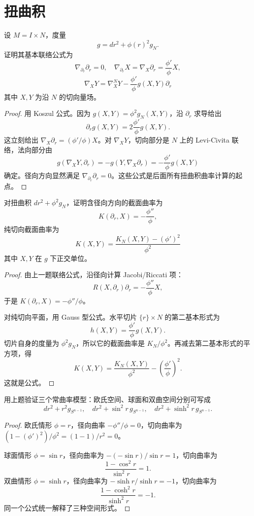 \documentclass[11pt,a4paper,openany]{ctexbook}
\numberwithin{equation}{chapter}
\begin{document}
\section{扭曲积}

\begin{problem}
设 \(M=I\times N\)，度量
\[
g=dr^2+\phi(r)^2g_N.
\]
证明其基本联络公式为
\[
\nabla_{\partial_r}\partial_r=0,\quad
\nabla_{\partial_r}X=\nabla_X\partial_r=\frac{\phi'}{\phi}X,
\]
\[
\nabla_XY=\nabla^N_XY-\frac{\phi'}{\phi}g(X,Y)\partial_r
\]
其中 \(X,Y\) 为沿 \(N\) 的切向量场。
\end{problem}
\begin{proof}
用 Koszul 公式。因为 \(g(X,Y)=\phi^2g_N(X,Y)\)，沿 \(\partial_r\) 求导给出
\[
\partial_r g(X,Y)=2\frac{\phi'}{\phi}g(X,Y).
\]
这立刻给出 \(\nabla_X\partial_r=(\phi'/\phi)X\)。对 \(\nabla_XY\)，切向部分是 \(N\) 上的 Levi-Civita 联络，法向部分由
\[
g(\nabla_XY,\partial_r)=-g(Y,\nabla_X\partial_r)=-\frac{\phi'}{\phi}g(X,Y)
\]
确定。径向方向显然满足 \(\nabla_{\partial_r}\partial_r=0\)。这些公式是后面所有扭曲积曲率计算的起点。
\end{proof}

\begin{problem}
对扭曲积 \(dr^2+\phi^2g_N\)，证明含径向方向的截面曲率为
\[
K(\partial_r,X)=-\frac{\phi''}{\phi},
\]
纯切向截面曲率为
\[
K(X,Y)=\frac{K_N(X,Y)-(\phi')^2}{\phi^2}
\]
其中 \(X,Y\) 在 \(g\) 下正交单位。
\end{problem}
\begin{proof}
由上一题联络公式，沿径向计算 Jacobi/Riccati 项：
\[
R(X,\partial_r)\partial_r=-\frac{\phi''}{\phi}X,
\]
于是 \(K(\partial_r,X)=-\phi''/\phi\)。

对纯切向平面，用 Gauss 型公式。水平切片 \(\{r\}\times N\) 的第二基本形式为
\[
h(X,Y)=\frac{\phi'}{\phi}g(X,Y).
\]
切片自身的度量为 \(\phi^2g_N\)，所以它的截面曲率是 \(K_N/\phi^2\)。再减去第二基本形式的平方项，得
\[
K(X,Y)=\frac{K_N(X,Y)}{\phi^2}-\left(\frac{\phi'}{\phi}\right)^2.
\]
这就是公式。
\end{proof}

\begin{problem}
用上题验证三个常曲率模型：欧氏空间、球面和双曲空间分别可写成
\[
dr^2+r^2g_{S^{n-1}},\quad
dr^2+\sin^2 r\,g_{S^{n-1}},\quad
dr^2+\sinh^2 r\,g_{S^{n-1}}.
\]
\end{problem}
\begin{proof}
欧氏情形 \(\phi=r\)，径向曲率 \(-\phi''/\phi=0\)，切向曲率为 \((1-(\phi')^2)/\phi^2=(1-1)/r^2=0\)。

球面情形 \(\phi=\sin r\)，径向曲率为 \(-(-\sin r)/\sin r=1\)，切向曲率为
\[
\frac{1-\cos^2r}{\sin^2r}=1.
\]
双曲情形 \(\phi=\sinh r\)，径向曲率为 \(-\sinh r/\sinh r=-1\)，切向曲率为
\[
\frac{1-\cosh^2r}{\sinh^2r}=-1.
\]
同一个公式统一解释了三种空间形式。
\end{proof}
\end{document}
